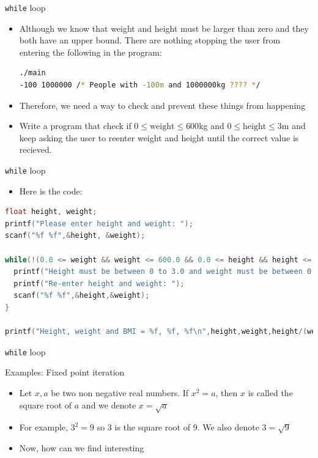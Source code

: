 \documentclass[10pt,xcolor={table,dvipsnames},t]{beamer}
\begin{document}
\begin{frame}[fragile]{\texttt{while} loop}
    \begin{itemize}
      \item Although we know that weight and height must be larger than zero and they both have an upper bound. There are nothing stopping the user from entering the following in the program:
\begin{lstlisting}[language=bash]
./main
-100 1000000 /* People with -100m and 1000000kg ???? */
\end{lstlisting}
    \item Therefore, we need a way to check and prevent these things from happening
    \item Write a program that check if $0\leq \text{weight} \leq 600$kg and $0 \leq \text{height} \leq 3$m and keep asking the user to reenter weight and height until the correct value is recieved.
    \end{itemize}
\end{frame}

\begin{frame}[fragile]{\texttt{while} loop}
  \begin{itemize}
    \item Here is the code:
  \end{itemize}
\begin{lstlisting}[language=C]
float height, weight;
printf("Please enter height and weight: ");
scanf("%f %f",&height, &weight);

while(!(0.0 <= weight && weight <= 600.0 && 0.0 <= height && height <= 3.0)) {
  printf("Height must be between 0 to 3.0 and weight must be between 0 to 600.0!\n");
  printf("Re-enter height and weight: ");
  scanf("%f %f",&height,&weight);
}

printf("Height, weight and BMI = %f, %f, %f\n",height,weight,height/(weight*weight));
\end{lstlisting}
\end{frame}


\begin{frame}{\texttt{while} loop}
  \begin{exampleblock}{Examples: Fixed point iteration}
    \begin{itemize}
      \item Let $x,a$ be two non negative real numbers. If $x^2 = a$, then $x$ is called the square root of $a$ and we denote $x = \sqrt{a}$
      \item For example, $3^2 = 9$ so $3$ is the square root of $9$. We also denote $3 = \sqrt{9}$
      \item Now, how can we find interesting 
    \end{itemize}
  \end{exampleblock}
\end{frame}
\end{document}
